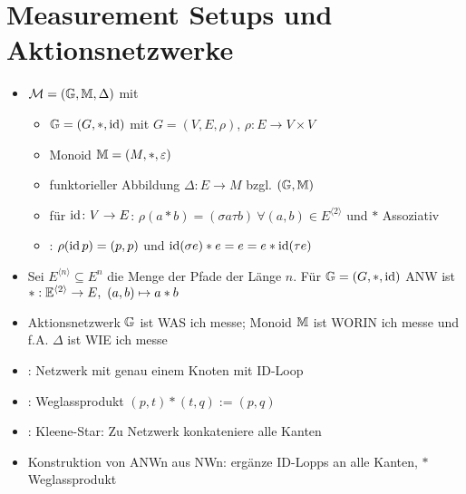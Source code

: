 \documentclass[12pt]{scrartcl}
\begin{document}
	\section{Measurement Setups und Aktionsnetzwerke}
	\begin{itemize}
		\item {} $\mathcal{M}=(\mathbb{G},\mathbb{M},\Delta)$ mit
			\begin{itemize}
				\item {} $\mathbb{G}=(G,\ast,\operatorname{id})$ mit
				 $G=(V,E,\rho)$, $\rho\colon E\to V\times V$
				\item Monoid $\mathbb{M}=(M,\ast,\varepsilon)$
				\item funktorieller Abbildung $\Delta\colon E\to M$ bzgl. $(\mathbb{G},\mathbb{M})$
				\item {} für $\operatorname{id}\colon V\to E$: $\rho(a\ast b)=(\sigma a\tau b)~\forall (a,b)\in E^{\langle2\rangle}$ und $\ast$ Assoziativ
				\item {}: $\rho(\operatorname{id} p)=(p,p)$ und $\operatorname{id}(\sigma e)\ast e=e=e\ast\operatorname{id}(\tau e)$
			\end{itemize}
		\item Sei $E^{\langle n\rangle}\subseteq E^n$ die Menge der Pfade der Länge $n$.
		Für $\mathbb{G}=(G,\ast,\operatorname{id})$ ANW ist $\ast:\mathbb{E}^{\langle2\rangle}\to E,~(a,b)\mapsto a\ast b$
		\item Aktionsnetzwerk $\mathbb{G}$ ist WAS ich messe; Monoid $\mathbb{M}$ ist WORIN ich messe und f.A. $\Delta$ ist WIE ich messe
		\item {}: Netzwerk mit genau einem Knoten mit ID-Loop
		\item {}: Weglassprodukt $(p,t)\ast(t,q):=(p,q)$
		\item {}: Kleene-Star: Zu Netzwerk konkateniere alle Kanten
		\item Konstruktion von ANWn aus NWn: ergänze ID-Lopps an alle Kanten, $\ast$ Weglassprodukt
		

\end{itemize}
\end{document}
